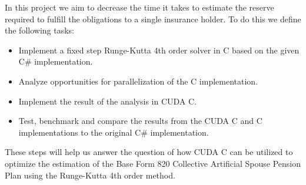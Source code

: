 
In this project we aim to decrease the time it takes to estimate the reserve required to fulfill the obligations to a single insurance holder. To do this we define the following tasks:

\begin{itemize}
	\item Implement a fixed step Runge-Kutta 4th order solver in C based on the given C\# implementation.
	\item Analyze opportunities for parallelization of the C implementation.
	\item Implement the result of the analysis in CUDA C.
	\item Test, benchmark and compare the results from the CUDA C and C implementations to the original C\# implementation.
\end{itemize}

These steps will help us answer the question of how CUDA C can be utilized to optimize the estimation of the Base Form 820 Collective Artificial Spouse Pension Plan using the Runge-Kutta 4th order method.